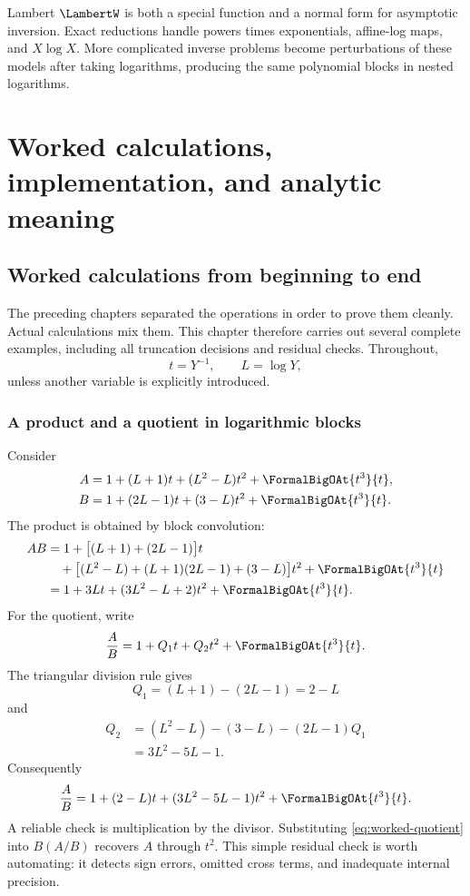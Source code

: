 \documentclass[11pt,oneside]{book}
\theoremstyle{definition}
\theoremstyle{remark}
\begin{document}
\begin{summarybox}
Lambert $\LambertW$ is both a special function and a normal form for asymptotic
inversion.  Exact reductions handle powers times exponentials, affine-log
maps, and $X\log X$.  More complicated inverse problems become perturbations
of these models after taking logarithms, producing the same polynomial blocks
in nested logarithms.
\end{summarybox}


\part{Worked calculations, implementation, and analytic meaning}
\label{part:practice}

\chapter{Worked calculations from beginning to end}
\label{ch:worked-calculations}

The preceding chapters separated the operations in order to prove them
cleanly. Actual calculations mix them. This chapter therefore carries out
several complete examples, including all truncation decisions and residual
checks. Throughout,
\[
 t=Y^{-1},\qquad L=\log Y,
\]
unless another variable is explicitly introduced.

\section{A product and a quotient in logarithmic blocks}
Consider
\begin{align*}
 A&=1+(L+1)t+(L^2-L)t^2+\FormalBigOAt{t^3}{t},\\
 B&=1+(2L-1)t+(3-L)t^2+\FormalBigOAt{t^3}{t}.
\end{align*}
The product is obtained by block convolution:
\begin{align*}
 AB
 &=1+\bigl[(L+1)+(2L-1)\bigr]t\\
 &\quad+\bigl[(L^2-L)+(L+1)(2L-1)+(3-L)\bigr]t^2
   +\FormalBigOAt{t^3}{t}\\
 &=1+3Lt+(3L^2-L+2)t^2+\FormalBigOAt{t^3}{t}.
\end{align*}
For the quotient, write
\[
 \frac AB=1+Q_1t+Q_2t^2+\FormalBigOAt{t^3}{t}.
\]
The triangular division rule gives
\[
 Q_1=(L+1)-(2L-1)=2-L
\]
and
\begin{align*}
 Q_2
 &=(L^2-L)-(3-L)-(2L-1)Q_1\\
 &=3L^2-5L-1.
\end{align*}
Consequently
\begin{equation}\label{eq:worked-quotient}
 \frac AB
 =1+(2-L)t+(3L^2-5L-1)t^2+\FormalBigOAt{t^3}{t}.
\end{equation}
A reliable check is multiplication by the divisor. Substituting
\eqref{eq:worked-quotient} into $B(A/B)$ recovers $A$ through $t^2$. This
simple residual check is worth automating: it detects sign errors, omitted
cross terms, and inadequate internal precision.
\end{document}
